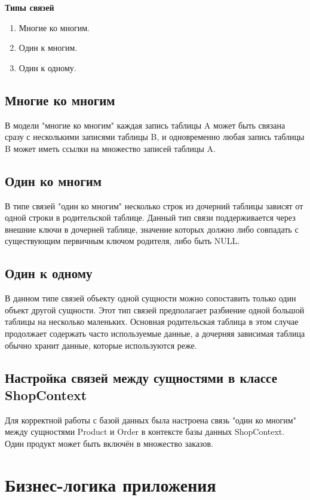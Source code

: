 \documentclass[a4paper,12pt]{report}
\begin{document}
\textbf{Типы связей}
\begin{enumerate}
    \item
        Многие ко многим.
    \item
        Один к многим.
    \item
        Один к одному.
\end{enumerate}

\subsection{Многие ко многим}

В модели "многие ко многим" каждая запись таблицы A может быть связана сразу с несколькими записями таблицы B, 
и одновременно любая запись таблицы B может иметь ссылки на множество записей таблицы A.

\subsection{Один ко многим}

В типе связей "один ко многим" несколько строк из дочерний таблицы зависят от одной строки в родительской таблице.
Данный тип связи поддерживается через внешние ключи в дочерней таблице, значение которых должно либо совпадать 
с существующим первичным ключом родителя, либо быть NULL.

\subsection{Один к одному}

В данном типе связей объекту одной сущности можно сопоставить только один объект другой сущности.
Этот тип связей предполагает разбиение одной большой таблицы на несколько маленьких. 
Основная родительская таблица в этом случае продолжает содержать часто используемые данные, 
а дочерняя зависимая таблица обычно хранит данные, которые используются реже.

\subsection{Настройка связей между сущностями в классе ShopContext}

Для корректной работы с базой данных была настроена связь "один ко многим" между сущностями Product и Order 
в контексте базы данных ShopContext. Один продукт может быть включён в множество заказов.

\section{Бизнес-логика приложения}
\end{document}
